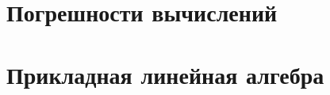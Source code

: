 \maketitle
\newpage

\section{Погрешности вычислений}





\section{Прикладная линейная алгебра}

%
%
%
%
%
%